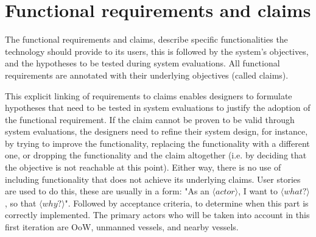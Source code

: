 \section{Functional requirements and claims}
The functional requirements and claims, describe specific functionalities the technology should provide to its users, this is followed by the system’s objectives, and the hypotheses to be tested during system evaluations. All functional requirements are annotated with their underlying objectives (called claims).

This explicit linking of requirements to claims enables designers to formulate hypotheses that need to be tested in system evaluations to justify the adoption of the functional requirement. If the claim cannot be proven to be valid through system evaluations, the designers need to refine their system design, for instance, by trying to improve the functionality, replacing the functionality with a different one, or dropping the functionality and the claim altogether (i.e. by deciding that the objective is not reachable at this point). Either way, there is no use of including functionality that does not achieve its underlying claims. User stories are used to do this, these are usually in a form: "As an $\langle actor \rangle$, I want to $\langle what? \rangle$, so that $\langle why? \rangle$". Followed by acceptance criteria, to determine when this part is correctly implemented.
The primary actors who will be taken into account in this first iteration are \acf{OoW}, unmanned vessels, and nearby vessels.

